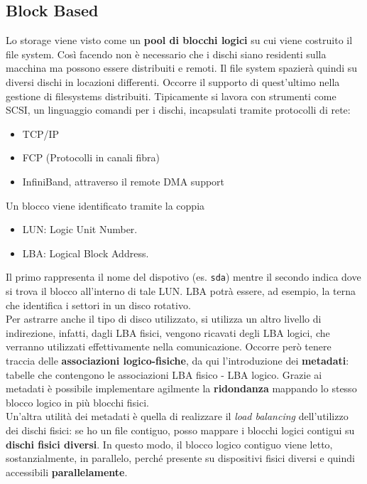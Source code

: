 \documentclass{article}
\begin{document}
		\subsection{Block Based}
		Lo storage viene visto come un \textbf{pool di blocchi logici} su cui viene costruito il file system. Così facendo non è necessario che i dischi siano residenti sulla macchina ma possono essere distribuiti e remoti. Il file system spazierà quindi su diversi dischi in locazioni differenti. Occorre il supporto di quest'ultimo nella gestione di filesystems distribuiti.
		Tipicamente si lavora con strumenti come SCSI, un linguaggio comandi per i dischi, incapsulati tramite protocolli di rete:
		\begin{itemize}
		    \item TCP/IP
		    \item FCP (Protocolli in canali fibra)
		    \item InfiniBand, attraverso il remote DMA support
		\end{itemize}
		Un blocco viene identificato tramite la coppia 
		\begin{itemize}
		    \item LUN: Logic Unit Number.
		    \item LBA: Logical Block Address.
		\end{itemize}
	
		
		Il primo rappresenta il nome del dispotivo (es. \verb*|sda|) mentre il secondo indica dove si trova il blocco all’interno di tale LUN. LBA potrà essere, ad esempio, la terna che identifica i settori in un disco rotativo.\\
		
		Per astrarre anche il tipo di disco utilizzato, si utilizza un altro livello di indirezione, infatti, dagli LBA fisici, vengono ricavati degli LBA logici, che verranno utilizzati effettivamente nella comunicazione. Occorre però tenere traccia delle \textbf{associazioni logico-fisiche}, da qui l'introduzione dei \textbf{metadati}: tabelle che contengono le associazioni LBA fisico - LBA logico. Grazie ai metadati è possibile implementare agilmente la \textbf{ridondanza} mappando lo stesso blocco logico in più blocchi fisici.\\
		
		Un’altra utilità dei metadati è quella di realizzare il \emph{load balancing} dell’utilizzo dei dischi fisici: se ho un file contiguo, posso mappare i blocchi logici contigui su \textbf{dischi fisici diversi}. In questo modo, il blocco logico contiguo viene letto, sostanzialmente, in
		parallelo, perché presente su dispositivi fisici diversi e quindi accessibili \textbf{parallelamente}.\\
		
\end{document}
